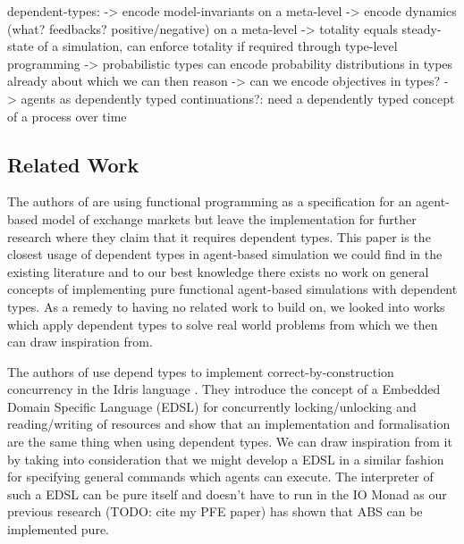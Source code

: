 
dependent-types:
-> encode model-invariants on a meta-level
-> encode dynamics (what? feedbacks? positive/negative) on a meta-level
-> totality equals steady-state of a simulation, can enforce totality if required through type-level programming
-> probabilistic types can encode probability distributions in types already about which we can then reason
-> can we encode objectives in types?
-> agents as dependently typed continuations?: need a dependently typed concept of a process over time

\subsection{Related Work}
The authors of \cite{botta_functional_2011} are using functional programming as a specification for an agent-based model of exchange markets but leave the implementation for further research where they claim that it requires dependent types. This paper is the closest usage of dependent types in agent-based simulation we could find in the existing literature and to our best knowledge there exists no work on general concepts of implementing pure functional agent-based simulations with dependent types. As a remedy to having no related work to build on, we looked into works which apply dependent types to solve real world problems from which we then can draw inspiration from. 

The authors of \cite{brady_correct-by-construction_2010} use depend types to implement correct-by-construction concurrency in the Idris language \cite{brady_idris_2013}. They introduce the concept of a Embedded Domain Specific Language (EDSL) for concurrently locking/unlocking and reading/writing of resources and show that an implementation and formalisation are the same thing when using dependent types. We can draw inspiration from it by taking into consideration that we might develop a EDSL in a similar fashion for specifying general commands which agents can execute. The interpreter of such a EDSL can be pure itself and doesn't have to run in the IO Monad as our previous research (TODO: cite my PFE paper) has shown that ABS can be implemented pure.

